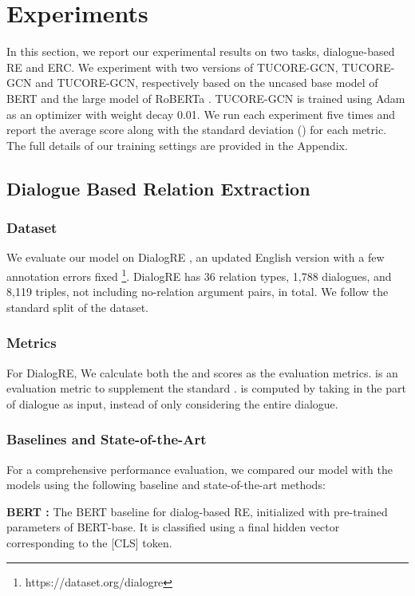 \documentclass[11pt]{article}
\begin{document}
\section{Experiments}
In this section, we report our experimental results on two tasks, dialogue-based RE and ERC. We experiment with two versions of TUCORE-GCN, TUCORE-GCN and TUCORE-GCN, respectively based on the uncased base model of BERT \citep{devlin-etal-2019-bert} and the large model of RoBERTa \citep{liu2019roberta}. TUCORE-GCN is trained using Adam \citep{DBLP:journals/corr/KingmaB14} as an optimizer with weight decay 0.01. We run each experiment five times and report the average score along with the standard deviation () for each metric. The full details of our training settings are provided in the Appendix.

\subsection{Dialogue Based Relation Extraction}
\subsubsection{Dataset}
We evaluate our model on DialogRE \citep{yu-etal-2020-dialogue}, an updated English version with a few annotation errors fixed \footnote{https://dataset.org/dialogre}. DialogRE has 36 relation types, 1,788 dialogues, and 8,119 triples, not including no-relation argument pairs, in total. We follow the standard split of the dataset.
\subsubsection{Metrics}
For DialogRE, We calculate both the  and  \citep{yu-etal-2020-dialogue} scores as the evaluation metrics.  is an evaluation metric to supplement the standard .  is computed by taking in the part of dialogue as input, instead of only considering the entire dialogue.
\subsubsection{Baselines and State-of-the-Art}
\label{ssec:RE-baseline}
For a comprehensive performance evaluation, we compared our model with the models using the following baseline and state-of-the-art methods: 

\textbf{BERT \citep{devlin-etal-2019-bert}:} The BERT baseline for dialog-based RE, initialized with pre-trained parameters of BERT-base. It is classified using a final hidden vector corresponding to the [CLS] token. 
\end{document}
